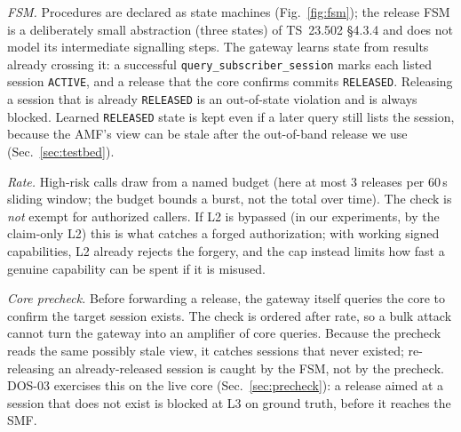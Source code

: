 \documentclass[conference]{IEEEtran}
\newcommand{\code}[1]{\texttt{\small #1}}
\begin{document}
\textit{FSM.} Procedures are declared as state machines (Fig.~\ref{fig:fsm}); the
release FSM is a deliberately small abstraction (three states) of TS~23.502 \S4.3.4 and does
not model its intermediate signalling steps. The gateway
learns state from results already crossing it: a successful
\code{query\_subscriber\_session} marks each listed session \code{ACTIVE}, and a release
that the core confirms commits \code{RELEASED}. Releasing a session that is already
\code{RELEASED} is an out-of-state violation and is always blocked. Learned
\code{RELEASED} state is kept even if a later query still lists the session, because the
AMF's view can be stale after the out-of-band release we use (Sec.~\ref{sec:testbed}).

\textit{Rate.} High-risk calls draw from a named budget (here at most 3 releases per 60\,s
sliding window; the budget bounds a burst, not the total over time). The check is \emph{not} exempt for authorized callers. If L2 is bypassed (in our
experiments, by the claim-only L2) this is what catches a forged authorization; with working signed
capabilities, L2 already rejects the forgery, and the cap instead limits how fast a genuine
capability can be spent if it is misused.

\textit{Core precheck.} Before forwarding a release, the gateway itself queries the core to
confirm the target session exists. The check is ordered after rate, so a bulk attack cannot
turn the gateway into an amplifier of core queries. Because the precheck reads the same
possibly stale view, it catches sessions that never existed; re-releasing an
already-released session is caught by the FSM, not by the precheck. DOS-03 exercises this on the
live core (Sec.~\ref{sec:precheck}): a release aimed at a session that does not exist is blocked
at L3 on ground truth, before it reaches the SMF.
\end{document}
